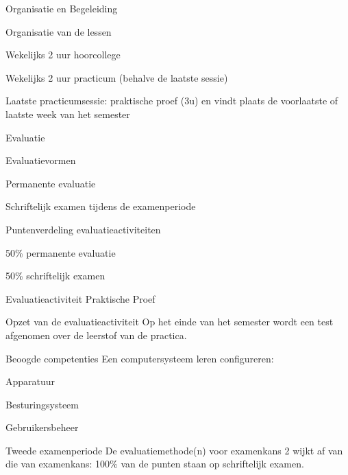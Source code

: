 \documentclass{studiewijzer}
\begin{document}
\showheader

\begin{categorybox}{Organisatie en Begeleiding}
    \begin{category}{Organisatie van de lessen}
        \begin{items}
            \item Wekelijks 2 uur hoorcollege
            \item Wekelijks 2 uur practicum (behalve de laatste sessie)
            \item Laatste practicumsessie: praktische proef (3u)
                  en vindt plaats de voorlaatste of laatste week van het semester
        \end{items}
    \end{category}
\end{categorybox}

\begin{categorybox}{Evaluatie}
    \begin{category}{Evaluatievormen}
        \begin{items}
            \item Permanente evaluatie
            \item Schriftelijk examen tijdens de examenperiode
        \end{items}
    \end{category}

    \begin{category}{Puntenverdeling evaluatieactiviteiten}
        \begin{items}
            \item 50\% permanente evaluatie
            \item 50\% schriftelijk examen
        \end{items}
    \end{category}
\end{categorybox}

\begin{categorybox}{Evaluatieactiviteit Praktische Proef}
    \begin{category}{Opzet van de evaluatieactiviteit}
        Op het einde van het semester wordt een test afgenomen over de leerstof van de practica.
    \end{category}

    \begin{category}{Beoogde competenties}
        Een computersysteem leren configureren:
        \begin{items}
            \item Apparatuur
            \item Besturingsysteem
            \item Gebruikersbeheer
        \end{items}
    \end{category}

    \begin{category}{Tweede examenperiode}
        De evaluatiemethode(n) voor examenkans 2 wijkt af van die van examenkans: 100\% van de punten staan op schriftelijk examen.
    \end{category}
\end{categorybox}
\end{document}
